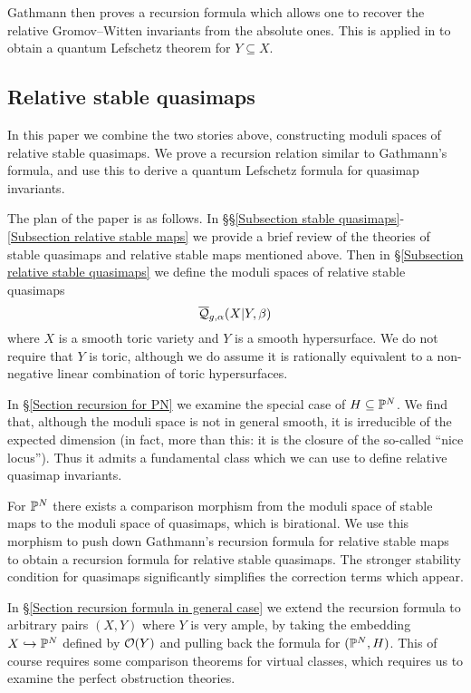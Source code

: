 Gathmann then proves a recursion formula which allows one to recover the relative Gromov--Witten invariants from the absolute ones. This is  applied in \cite{Ga-MF} to obtain a quantum Lefschetz theorem for $Y \subseteq X$.

\subsection{Relative stable quasimaps}
In this paper we combine the two stories above, constructing moduli spaces of relative stable quasimaps. We prove a recursion relation similar to Gathmann's formula, and use this to derive a quantum Lefschetz formula for quasimap invariants.

The plan of the paper is as follows. In \S\S \ref{Subsection stable quasimaps}-\ref{Subsection relative stable maps} we provide a brief review of the theories of stable quasimaps and relative stable maps mentioned above. Then in \S \ref{Subsection relative stable quasimaps} we define the moduli spaces of relative stable quasimaps
\begin{equation*} \overline{\mathcal Q}_{g,\alpha}(X|Y,\beta) \end{equation*}
where $X$ is a smooth toric variety and $Y$ is a smooth hypersurface. We do not require that $Y$ is toric, although we do assume it is rationally equivalent to a non-negative linear combination of toric hypersurfaces.

In \S \ref{Section recursion for PN} we examine the special case of $H \subseteq \mathbb P^N$. We find that, although the moduli space is not in general smooth, it is irreducible of the expected dimension (in fact, more than this: it is the closure of the so-called ``nice locus''). Thus it admits a fundamental class which we can use to define relative quasimap invariants.

For $\mathbb P^N$ there exists a comparison morphism from the moduli space of stable maps to the moduli space of quasimaps, which is birational. We use this morphism to push down Gathmann's recursion formula for relative stable maps to obtain a recursion formula for relative stable quasimaps. The stronger stability condition for quasimaps significantly simplifies the correction terms which appear.

In \S \ref{Section recursion formula in general case} we extend the recursion formula to arbitrary pairs $(X,Y)$ where $Y$ is very ample, by taking the embedding $X \hookrightarrow \mathbb P^N$ defined by $\mathcal{O}(Y)$ and pulling back the formula for $(\mathbb P^N,H)$. This of course requires some comparison theorems for virtual classes, which requires us to examine the perfect obstruction theories.

